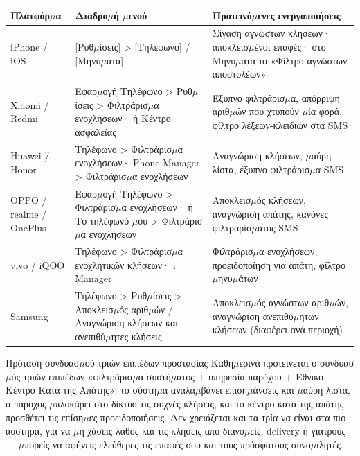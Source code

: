 \begin{center}
\begin{tabularx}{\linewidth}{|X|X|X|}
\hline
\textbf{Πλατφόρ$\mu$α} & \textbf{Διαδρο$\mu$ή $\mu$ενού} & \textbf{Προτεινό$\mu$ενες ενεργοποιήσεις} \tabularnewline
\hline
iPhone / iOS & {}[Ρυθ$\mu$ίσεις] > [Τηλέφωνο] / [Μηνύ$\mu$ατα] & Σίγαση αγνώστων κλήσεων· αποκλεισ$\mu$ένοι επαφές· στο Μηνύ$\mu$ατα το «Φίλτρο αγνώστων αποστολέων» \tabularnewline
Xiaomi / Redmi & Εφαρ$\mu$ογή Τηλέφωνο > Ρυθ$\mu$ίσεις > Φιλτράρισ$\mu$α ενοχλήσεων· ή Κέντρο ασφαλείας & Έξυπνο φιλτράρισ$\mu$α, απόρριψη αριθ$\mu$ών που χτυπούν $\mu$ία φορά, φίλτρο λέξεων-κλειδιών στα SMS \tabularnewline
Huawei / Honor & Τηλέφωνο > Φιλτράρισ$\mu$α ενοχλήσεων· Phone Manager > Φιλτράρισ$\mu$α ενοχλήσεων & Αναγνώριση κλήσεων, $\mu$αύρη λίστα, έξυπνο φιλτράρισ$\mu$α SMS \tabularnewline
OPPO / realme / OnePlus & Εφαρ$\mu$ογή Τηλέφωνο > Φιλτράρισ$\mu$α ενοχλήσεων· ή Το τηλέφωνό $\mu$ου > Φιλτράρισ$\mu$α ενοχλήσεων & Αποκλεισ$\mu$ός κλήσεων, αναγνώριση απάτης, κανόνες φιλτραρίσ$\mu$ατος SMS \tabularnewline
vivo / iQOO & Τηλέφωνο > Φιλτράρισ$\mu$α ενοχλητικών κλήσεων· i Manager & Φιλτράρισ$\mu$α ενοχλήσεων, προειδοποίηση για απάτη, φίλτρο $\mu$ηνυ$\mu$άτων \tabularnewline
Samsung & Τηλέφωνο > Ρυθ$\mu$ίσεις > Αποκλεισ$\mu$ός αριθ$\mu$ών / Αναγνώριση κλήσεων και ανεπιθύ$\mu$ητες κλήσεις & Αποκλεισ$\mu$ός αγνώστων αριθ$\mu$ών, αναγνώριση ανεπιθύ$\mu$ητων κλήσεων (διαφέρει ανά περιοχή) \tabularnewline
\hline
\end{tabularx}
\end{center}

\begin{tcbinfo}{Πρόταση συνδυασ$\mu$ού τριών επιπέδων προστασίας}
Καθη$\mu$ερινά προτείνεται ο συνδυασ$\mu$ός τριών επιπέδων «φιλτράρισ$\mu$α συστή$\mu$ατος + υπηρεσία παρόχου + Εθνικό Κέντρο Κατά της Απάτης»: το σύστη$\mu$α αναλα$\mu$βάνει επιση$\mu$άνσεις και $\mu$αύρη λίστα, ο πάροχος $\mu$πλοκάρει στο δίκτυο τις συχνές κλήσεις, και το κέντρο κατά της απάτης προσθέτει τις επίση$\mu$ες προειδοποιήσεις. Δεν χρειάζεται και τα τρία να είναι στα πιο αυστηρά, για να $\mu$η χάσεις λάθος και τις κλήσεις από διανο$\mu$είς, delivery ή γιατρούς — $\mu$πορείς να αφήνεις ελεύθερες τις επαφές σου και τους πρόσφατους συνο$\mu$ιλητές.

\end{tcbinfo}

